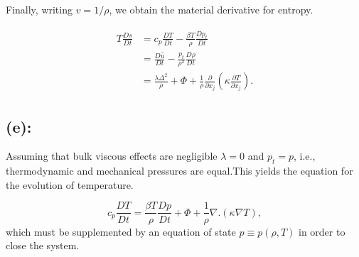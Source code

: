 \documentclass{article}
\begin{document}
Finally, writing $v = 1/\rho$, we obtain the material derivative for entropy.

\begin{align}\label{eq:entropy}
 \begin{split}
  T \frac{Ds}{Dt} &= c_{p} \frac{DT}{Dt} - \frac{\beta T}{\rho}\frac{Dp_{t}}{Dt}\\
  & = \frac{D\hat{u}}{Dt} - \frac{p_{t}}{\rho^{2}}\frac{D\rho}{Dt}\\
  & = \frac{\lambda \Delta^{2}}{\rho} + \Phi + \frac{1}{\rho} \frac{\partial }{\partial x_{j}}\left(\kappa \frac{\partial T}{\partial x_{j}} \right).
 \end{split}
\end{align}
\subsection*{(e):}
Assuming that bulk viscous effects are negligible $\lambda = 0 $ and $p_{t} = p$, i.e., thermodynamic and mechanical pressures are equal.This yields the equation for the evolution of temperature. 

\begin{equation}\label{eq:temperature}
 c_{p}\frac{DT}{Dt} = \frac{\beta T}{\rho}\frac{Dp}{Dt} + \Phi + \frac{1}{\rho}\nabla.(\kappa \nabla T),
\end{equation}
which must be supplemented by an equation of state $p \equiv p(\rho, T)$ in order to close the system. 

\end{document}
